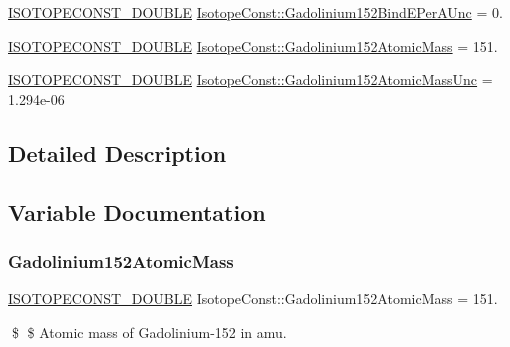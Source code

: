 \begin{DoxyCompactItemize}
\item 
\mbox{\hyperlink{group___isotope_const-_macros_ga8f45a7272ce02c0b4c65c44636ed719a}{I\+S\+O\+T\+O\+P\+E\+C\+O\+N\+S\+T\+\_\+\+D\+O\+U\+B\+LE}} \mbox{\hyperlink{group___isotope_const-_gadolinium-_gd152_ga33c190507a6ab03dbfaf869115925896}{Isotope\+Const\+::\+Gadolinium152\+Bind\+E\+Per\+A\+Unc}} = 0.
\item 
\mbox{\hyperlink{group___isotope_const-_macros_ga8f45a7272ce02c0b4c65c44636ed719a}{I\+S\+O\+T\+O\+P\+E\+C\+O\+N\+S\+T\+\_\+\+D\+O\+U\+B\+LE}} \mbox{\hyperlink{group___isotope_const-_gadolinium-_gd152_ga447f88cb6208482df589f19f7e4a9870}{Isotope\+Const\+::\+Gadolinium152\+Atomic\+Mass}} = 151.
\item 
\mbox{\hyperlink{group___isotope_const-_macros_ga8f45a7272ce02c0b4c65c44636ed719a}{I\+S\+O\+T\+O\+P\+E\+C\+O\+N\+S\+T\+\_\+\+D\+O\+U\+B\+LE}} \mbox{\hyperlink{group___isotope_const-_gadolinium-_gd152_ga16325652d638805e9e779a9cd3de9602}{Isotope\+Const\+::\+Gadolinium152\+Atomic\+Mass\+Unc}} = 1.\+294e-\/06
\end{DoxyCompactItemize}


\subsection{Detailed Description}


\subsection{Variable Documentation}
\mbox{\label{group___isotope_const-_gadolinium-_gd152_ga447f88cb6208482df589f19f7e4a9870}} 
\subsubsection{\texorpdfstring{Gadolinium152\+Atomic\+Mass}{Gadolinium152AtomicMass}}
{\footnotesize\ttfamily \mbox{\hyperlink{group___isotope_const-_macros_ga8f45a7272ce02c0b4c65c44636ed719a}{I\+S\+O\+T\+O\+P\+E\+C\+O\+N\+S\+T\+\_\+\+D\+O\+U\+B\+LE}} Isotope\+Const\+::\+Gadolinium152\+Atomic\+Mass = 151.}

\$ \$ Atomic mass of Gadolinium-\/152 in amu. \mbox{\label{group___isotope_const-_gadolinium-_gd152_ga16325652d638805e9e779a9cd3de9602}} 
